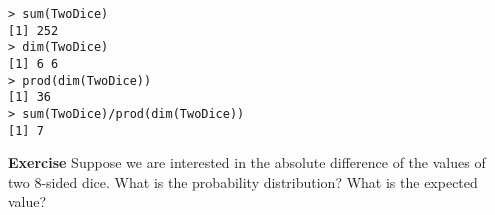 \begin{verbatim}
> sum(TwoDice)
[1] 252
> dim(TwoDice)
[1] 6 6
> prod(dim(TwoDice))
[1] 36
> sum(TwoDice)/prod(dim(TwoDice))
[1] 7
\end{verbatim}

\textbf{Exercise} Suppose we are interested in the absolute difference of the values of two 8-sided dice. What is the probability distribution? What is the expected value?

